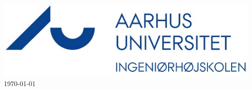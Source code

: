 \begin{center}
\includegraphics[scale=2]{billeder/iha-logo}\\ %


{\large \today}\\[3cm] %
\end{center}

